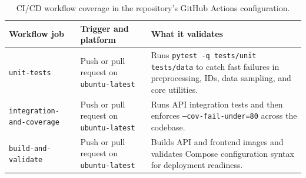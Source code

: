 \documentclass[11pt]{article}
\newcommand{\code}[1]{\texttt{#1}}
\begin{document}
\begin{table}[H]
\small
\centering
\begin{tabularx}{\textwidth}{p{}p{}X}
\toprule
Workflow job & Trigger and platform & What it validates \\
\midrule
\code{unit-tests} & Push or pull request on \code{ubuntu-latest} & Runs \code{pytest -q tests/unit tests/data} to catch fast failures in preprocessing, IDs, data sampling, and core utilities. \\
\code{integration-and-coverage} & Push or pull request on \code{ubuntu-latest} & Runs API integration tests and then enforces \code{--cov-fail-under=80} across the codebase. \\
\code{build-and-validate} & Push or pull request on \code{ubuntu-latest} & Builds API and frontend images and validates Compose configuration syntax for deployment readiness. \\
\bottomrule
\end{tabularx}
\caption{CI/CD workflow coverage in the repository's GitHub Actions configuration.}
\end{table}
\end{document}
